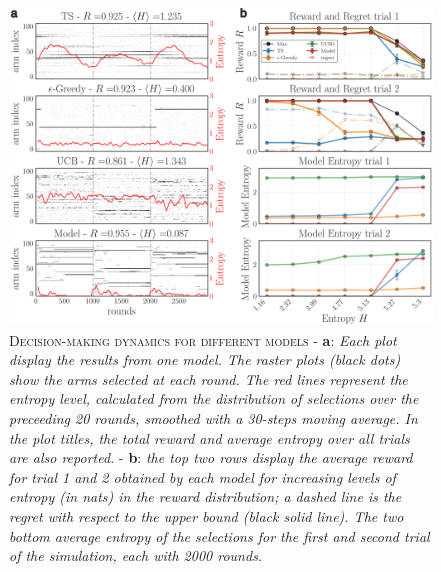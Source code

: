 \begin{figure}[H]
    \centering
    \includegraphics[width=1.0\textwidth]{figures/entropy_main_plot_2.png}
    \caption{\textsc{Decision-making dynamics for different models} - \textbf{a}: \textit{Each plot display the results from one model. The raster plots (black dots) show the arms selected at each round.
The red lines represent the entropy level, calculated from the distribution of selections over the preceeding 20 rounds, smoothed with a 30-steps moving average. In the plot titles, the total reward and average entropy over all trials are also reported.}
 - \textbf{b}: \textit{the top two rows display  the average reward for trial 1 and 2 obtained by each model for increasing levels of entropy (in nats) in the reward distribution; a dashed line is the regret with respect to the upper bound (black solid line). The two bottom average entropy of the selections for the first and second trial of the simulation, each with 2000 rounds.}}
    \label{fig:entropy_fig1}
\end{figure}



